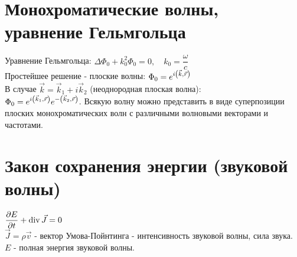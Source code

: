 \begin{multicols*}{2}
		\section{Монохроматические волны, уравнение Гельмгольца}
		Уравнение Гельмгольца:
		$\Delta \Phi_0+k_0^2 \Phi_0 = 0,\quad k_0=\dfrac{\omega}{c}$\\
		Простейшее решение - плоские волны:
		$\Phi_0 = e^{i\qty(\vec{k}, \vec{r})}$\\
		В случае $\vec{k} = \vec{k}_1 + i\vec{k}_2$ (неоднородная плоская волна):\\
		$\Phi_0 = e^{i\qty(\vec{k}_1, \vec{r})}e^{-\qty(\vec{k}_2,\vec{r})}$.
		Всякую волну можно представить в виде суперпозиции плоских монохроматических волн с различными волновыми векторами и частотами.
		
		\section{Закон сохранения энергии (звуковой волны)}
		$\dfrac{\partial E}{\partial t} + \operatorname{div}\vec{J}=0$\\
		$\vec{J} = \rho \vec{v}$ - вектор Умова-Пойнтинга - интенсивность звуковой волны, сила звука. \\
		$E$ - полная энергия звуковой волны.
		
	\end{multicols*}
